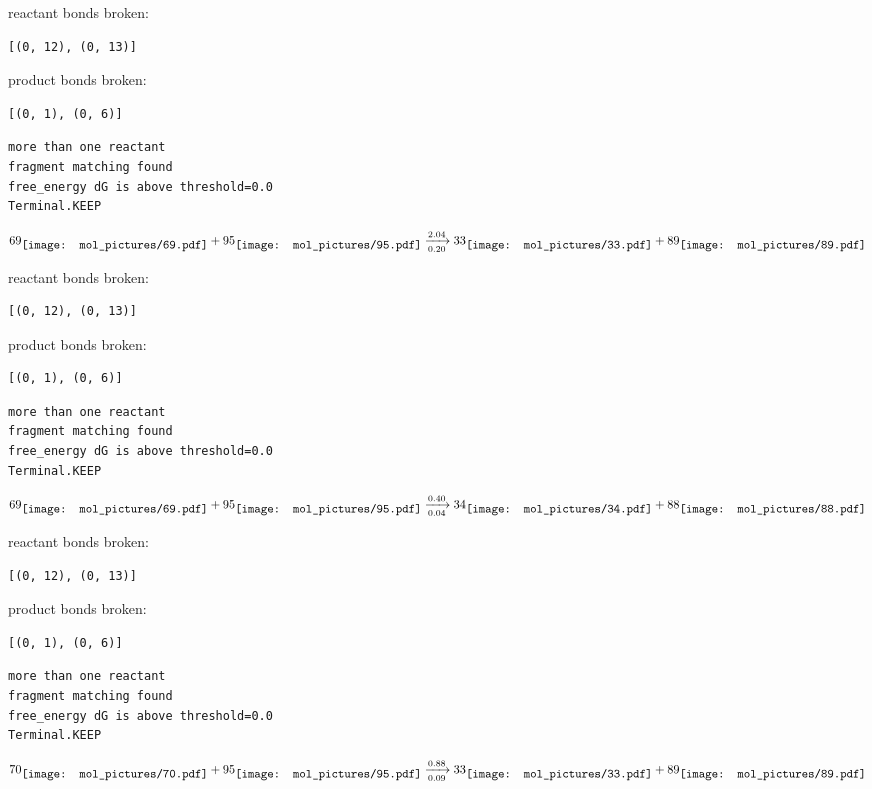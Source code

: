 \documentclass{article}
\begin{document}
reactant bonds broken:\begin{verbatim}
[(0, 12), (0, 13)]
\end{verbatim}
product bonds broken:\begin{verbatim}
[(0, 1), (0, 6)]
\end{verbatim}




\vspace{1cm}
\begin{verbatim}
more than one reactant
fragment matching found
free_energy dG is above threshold=0.0
Terminal.KEEP
\end{verbatim}
$$
69
\raisebox{-.5\height}{\texttt{[image: mol\_pictures/69.pdf]}}
+
95
\raisebox{-.5\height}{\texttt{[image: mol\_pictures/95.pdf]}}
\xrightarrow[0.20]{2.04}
33
\raisebox{-.5\height}{\texttt{[image: mol\_pictures/33.pdf]}}
+
89
\raisebox{-.5\height}{\texttt{[image: mol\_pictures/89.pdf]}}
$$


reactant bonds broken:\begin{verbatim}
[(0, 12), (0, 13)]
\end{verbatim}
product bonds broken:\begin{verbatim}
[(0, 1), (0, 6)]
\end{verbatim}




\vspace{1cm}
\begin{verbatim}
more than one reactant
fragment matching found
free_energy dG is above threshold=0.0
Terminal.KEEP
\end{verbatim}
$$
69
\raisebox{-.5\height}{\texttt{[image: mol\_pictures/69.pdf]}}
+
95
\raisebox{-.5\height}{\texttt{[image: mol\_pictures/95.pdf]}}
\xrightarrow[0.04]{0.40}
34
\raisebox{-.5\height}{\texttt{[image: mol\_pictures/34.pdf]}}
+
88
\raisebox{-.5\height}{\texttt{[image: mol\_pictures/88.pdf]}}
$$


reactant bonds broken:\begin{verbatim}
[(0, 12), (0, 13)]
\end{verbatim}
product bonds broken:\begin{verbatim}
[(0, 1), (0, 6)]
\end{verbatim}




\vspace{1cm}
\begin{verbatim}
more than one reactant
fragment matching found
free_energy dG is above threshold=0.0
Terminal.KEEP
\end{verbatim}
$$
70
\raisebox{-.5\height}{\texttt{[image: mol\_pictures/70.pdf]}}
+
95
\raisebox{-.5\height}{\texttt{[image: mol\_pictures/95.pdf]}}
\xrightarrow[0.09]{0.88}
33
\raisebox{-.5\height}{\texttt{[image: mol\_pictures/33.pdf]}}
+
89
\raisebox{-.5\height}{\texttt{[image: mol\_pictures/89.pdf]}}
$$
\end{document}
